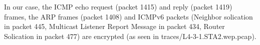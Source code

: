 In our case, the ICMP echo request (packet 1415) and reply (packet 1419) frames, the ARP frames (packet 1408) and ICMPv6 packets (Neighbor solication in packet 445, Multicast Listener Report Message in packet 434, Router Solication in packet 477) are encrypted (as seen in traces/L4-3-1.STA2.wep.pcap).
